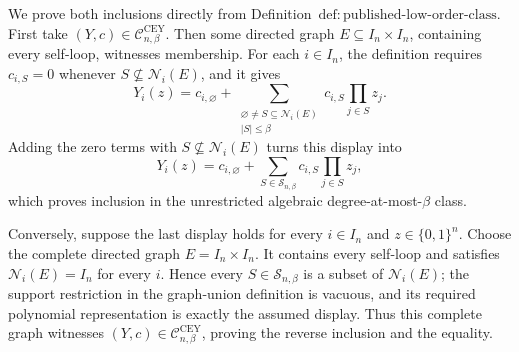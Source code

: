 We prove both inclusions directly from Definition~\(\mathrm{def{:}published\text{-}low\text{-}order\text{-}class}\).  First take \((Y,c)\in\mathcal C^{\mathrm{CEY}}_{n,\beta}\).  Then some directed graph \(E\subseteq I_n\times I_n\), containing every self-loop, witnesses membership.  For each \(i\in I_n\), the definition requires \(c_{i,S}=0\) whenever \(S\nsubseteq\mathcal N_i(E)\), and it gives
\[
Y_i(z)=c_{i,\varnothing}
+\sum_{\substack{\varnothing\ne S\subseteq\mathcal N_i(E)\\|S|\le\beta}}
c_{i,S}\prod_{j\in S}z_j.
\]
Adding the zero terms with \(S\nsubseteq\mathcal N_i(E)\) turns this display into
\[
Y_i(z)=c_{i,\varnothing}
+\sum_{S\in\mathcal S_{n,\beta}}c_{i,S}\prod_{j\in S}z_j,
\]
which proves inclusion in the unrestricted algebraic degree-at-most-\(\beta\) class.

Conversely, suppose the last display holds for every \(i\in I_n\) and \(z\in\{0,1\}^n\).  Choose the complete directed graph \(E=I_n\times I_n\).  It contains every self-loop and satisfies \(\mathcal N_i(E)=I_n\) for every \(i\).  Hence every \(S\in\mathcal S_{n,\beta}\) is a subset of \(\mathcal N_i(E)\); the support restriction in the graph-union definition is vacuous, and its required polynomial representation is exactly the assumed display.  Thus this complete graph witnesses \((Y,c)\in\mathcal C^{\mathrm{CEY}}_{n,\beta}\), proving the reverse inclusion and the equality.